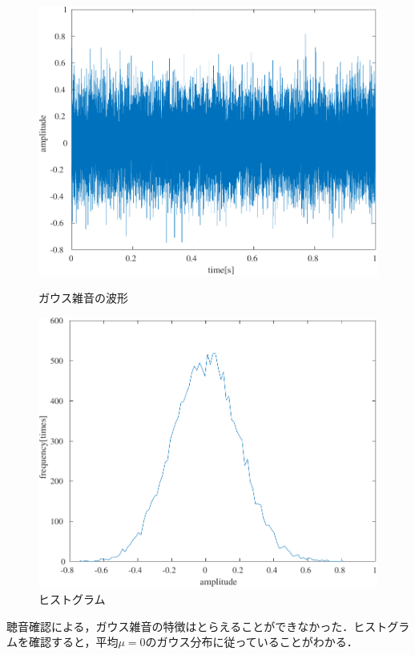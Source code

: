 \begin{figure}[h]
    \centering
    \begin{minipage}[b]{.48\textwidth}
        \centering
        \includegraphics[keepaspectratio,height=.2\textheight]{../../Figures/01_05_0.pdf}
        \caption{ガウス雑音の波形}
        \label{fig:ガウス雑音の波形}
    \end{minipage}
    \begin{minipage}[b]{.48\textwidth}
        \centering
        \includegraphics[keepaspectratio,height=.2\textheight]{../../Figures/01_05_1.pdf}
        \caption{ヒストグラム}
        \label{fig:ヒストグラム}
    \end{minipage}
\end{figure}
\consideration
聴音確認による，ガウス雑音の特徴はとらえることができなかった．ヒストグラムを確認すると，平均\(\mu=0\)のガウス分布に従っていることがわかる．